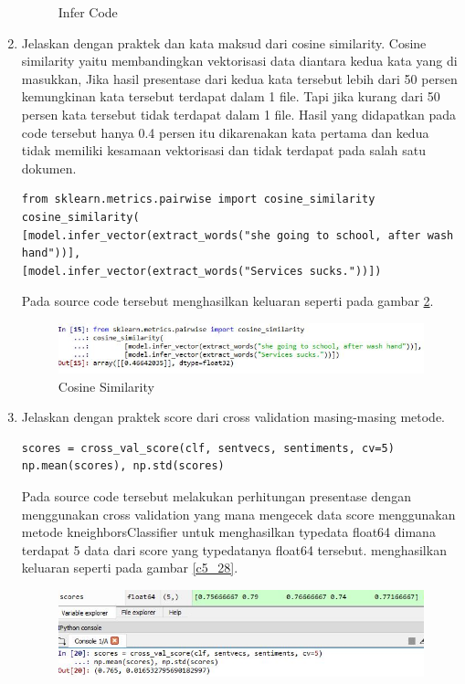 \begin{enumerate}
\begin{figure}[!htbp]
	\caption{Infer Code}
	\label{c5_26}
\end{figure}
\item Jelaskan dengan praktek dan kata maksud dari cosine similarity.
\subitem Cosine similarity yaitu membandingkan vektorisasi data diantara kedua kata yang di masukkan, Jika hasil presentase dari kedua kata tersebut lebih dari 50 persen kemungkinan kata tersebut terdapat dalam 1 file. Tapi jika kurang dari 50 persen kata tersebut tidak terdapat dalam 1 file. Hasil yang didapatkan pada code tersebut hanya 0.4 persen itu dikarenakan kata pertama dan kedua tidak memiliki kesamaan vektorisasi dan tidak terdapat pada salah satu dokumen.
\begin{verbatim}
from sklearn.metrics.pairwise import cosine_similarity
cosine_similarity(
[model.infer_vector(extract_words("she going to school, after wash hand"))],
[model.infer_vector(extract_words("Services sucks."))])
\end{verbatim}
\subitem Pada source code tersebut menghasilkan keluaran seperti pada gambar \ref{c5_27}.
\begin{figure}[!htbp]
	\centerline{\includegraphics[width=1\textwidth]{figures/huda/chapter5/27.JPG}}
	\caption{Cosine Similarity}
	\label{c5_27}
\end{figure}
\item Jelaskan dengan praktek score dari cross validation masing-masing metode.
\begin{verbatim}
scores = cross_val_score(clf, sentvecs, sentiments, cv=5)
np.mean(scores), np.std(scores)
\end{verbatim}
\subitem Pada source code tersebut melakukan perhitungan presentase dengan menggunakan cross validation yang mana mengecek data score menggunakan metode kneighborsClassifier untuk menghasilkan typedata float64 dimana terdapat 5 data dari score yang typedatanya float64 tersebut. menghasilkan keluaran seperti pada gambar \ref{c5_28}.
\begin{figure}[!htbp]
	\centerline{\includegraphics[width=1\textwidth]{figures/huda/chapter5/28.JPG}}

\end{figure}
\end{enumerate}
